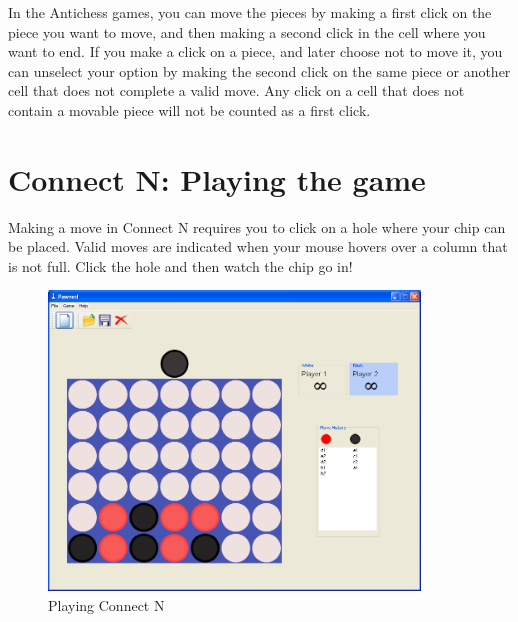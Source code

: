 \documentclass{report}
\begin{document}
			In the Antichess games, you can move the pieces by making a first click on
			the piece you want to move, and then making a second click in the cell where
			you want to end. If you make a click on a piece, and later choose not to move
			it, you can	unselect your option by making the second click on the same piece
			or another cell that does not complete a valid move. Any click on a cell that
			does not contain a movable piece will not be counted as a first click.
			
			\section{Connect N: Playing the game}
			
			Making a move in Connect N requires you to click on a hole where your chip can
			be placed. Valid moves are indicated when your mouse hovers over a column
			that is not full. Click the hole and then watch the chip go in! 		
							
				\begin{figure}
					\begin{center}
						\includegraphics[width=280pt]{img/c4-in-game.png}
							\caption{Playing Connect N}						
					\end{center}
				\end{figure}
			
			
\end{document}
